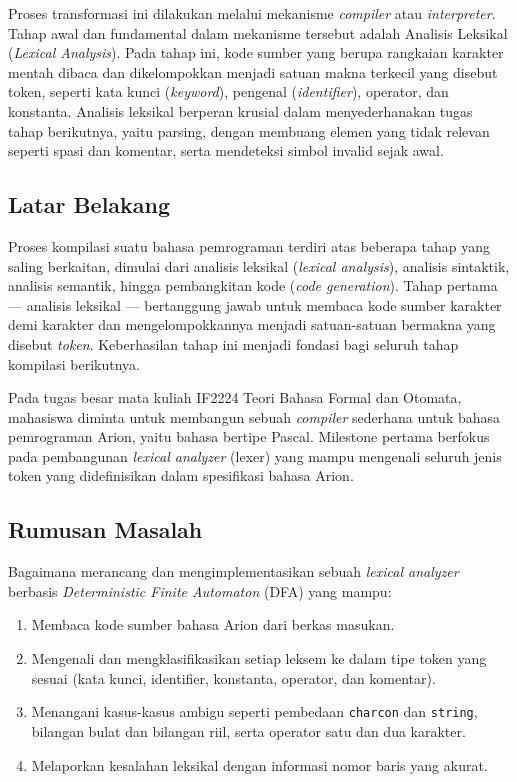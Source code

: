 \documentclass[12pt,a4paper]{article}
\begin{document}
Proses transformasi ini dilakukan melalui mekanisme \textit{compiler} atau
\textit{interpreter}. Tahap awal dan fundamental dalam mekanisme tersebut adalah
Analisis Leksikal (\textit{Lexical Analysis}). Pada tahap ini, kode sumber yang berupa
rangkaian karakter mentah dibaca dan dikelompokkan menjadi satuan makna terkecil
yang disebut token, seperti kata kunci (\textit{keyword}), pengenal
(\textit{identifier}), operator, dan konstanta. Analisis leksikal berperan
krusial dalam menyederhanakan tugas tahap berikutnya, yaitu parsing, dengan
membuang elemen yang tidak relevan seperti spasi dan komentar, serta mendeteksi
simbol invalid sejak awal.

\subsection{Latar Belakang}
Proses kompilasi suatu bahasa pemrograman terdiri atas beberapa tahap yang saling berkaitan, dimulai dari analisis leksikal (\textit{lexical analysis}), analisis sintaktik, analisis semantik, hingga pembangkitan kode (\textit{code generation}). Tahap pertama --- analisis leksikal --- bertanggung jawab untuk membaca kode sumber karakter demi karakter dan mengelompokkannya menjadi satuan-satuan bermakna yang disebut \textit{token}. Keberhasilan tahap ini menjadi fondasi bagi seluruh tahap kompilasi berikutnya.

Pada tugas besar mata kuliah IF2224 Teori Bahasa Formal dan Otomata, mahasiswa diminta untuk membangun sebuah \textit{compiler} sederhana untuk bahasa pemrograman Arion, yaitu bahasa bertipe Pascal. Milestone pertama berfokus pada pembangunan \textit{lexical analyzer} (lexer) yang mampu mengenali seluruh jenis token yang didefinisikan dalam spesifikasi bahasa Arion.

\subsection{Rumusan Masalah}
Bagaimana merancang dan mengimplementasikan sebuah \textit{lexical analyzer} berbasis \textit{Deterministic Finite Automaton} (DFA) yang mampu:
\begin{enumerate}[label=\arabic*.]
  \item Membaca kode sumber bahasa Arion dari berkas masukan.
  \item Mengenali dan mengklasifikasikan setiap leksem ke dalam tipe token yang sesuai (kata kunci, identifier, konstanta, operator, dan komentar).
  \item Menangani kasus-kasus ambigu seperti pembedaan \texttt{charcon} dan \texttt{string}, bilangan bulat dan bilangan riil, serta operator satu dan dua karakter.
  \item Melaporkan kesalahan leksikal dengan informasi nomor baris yang akurat.
\end{enumerate}
\end{document}
